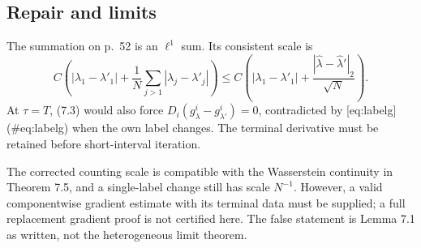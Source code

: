\documentclass[10pt]{article}
\begin{document}
\subsection*{Repair and limits}
The summation on p. 52 is an \(\ell^1\) sum. Its consistent scale is \[C\left(|\lambda_1-\lambda'_1|
+\frac1N\sum_{j>1}|\lambda_j-\lambda'_j|\right)
\le C\left(|\lambda_1-\lambda'_1|
+\frac{|\widehat\lambda-\widehat\lambda'|_2}{\sqrt N}\right).\] At \(\tau=T\), (7.3) would also force \(D_i(g_\lambda^i-g_{\lambda'}^i)=0\), contradicted by [eq:labelg] (\#eq:labelg) when the own label changes. The terminal derivative must be retained before short-interval iteration.\par
The corrected counting scale is compatible with the Wasserstein continuity in Theorem 7.5, and a single-label change still has scale \(N^{-1}\). However, a valid componentwise gradient estimate with its terminal data must be supplied; a full replacement gradient proof is not certified here. The false statement is Lemma 7.1 as written, not the heterogeneous limit theorem.\par
\end{document}
